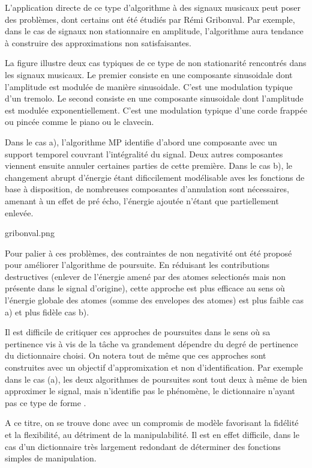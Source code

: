 L'application directe de ce type d'algorithme à des signaux musicaux peut poser des problèmes, dont certains ont été étudiés par Rémi Gribonval. Par exemple, dans le cas de signaux non stationnaire en amplitude, l'algorithme aura tendance à construire des approximations non satisfaisantes.

La figure illustre deux cas typiques de ce type de non stationarité rencontrés dans les signaux musicaux. Le premier consiste en une composante sinusoidale dont l'amplitude est modulée de manière sinusoidale. C'est une modulation typique d'un tremolo. Le second consiste en une composante sinusoidale dont l'amplitude est modulée exponentiellement. C'est une modulation typique d'une corde frappée ou pincée comme le piano ou le clavecin.

Dans le cas a), l'algorithme MP identifie d'abord une composante avec un support temporel couvrant l'intégralité du signal. Deux autres composantes viennent ensuite annuler certaines parties de cette première. Dans le cas b), le changement abrupt d'énergie étant dificcilement modélisable aves les fonctions de base à disposition, de nombreuses composantes d'annulation sont nécessaires, amenant à un effet de pré écho, l'énergie ajoutée n'étant que partiellement enlevée.

gribonval.png

Pour palier à ces problèmes, des contraintes de non negativité ont été proposé pour améliorer l'algorithme de poursuite\cite{gribonval1996sound}. En réduisant les contributions destructives (enlever de l'énergie amené par des atomes selectionés mais non présente dans le signal d'origine), cette approche est plus efficace au sens où l'énergie globale des atomes (somme des envelopes des atomes) est plus faible cas a)  et plus fidèle cas b).

Il est difficile de critiquer ces approches de poursuites dans le sens où sa pertinence vis à vis de la tâche va grandement dépendre du degré de pertinence du dictionnaire choisi. On notera tout de même que ces approches sont construites avec un objectif d'appromixation et non d'identification. Par exemple dans le cas (a), les deux algorithmes de poursuites sont tout deux à même de bien approximer le signal, mais \og n'identifie \fg pas le phénomène, le dictionnaire n'ayant pas ce type de forme .

A ce titre, on se trouve donc avec un compromis de modèle favorisant la fidélité et la flexibilité, au détriment de la manipulabilité. Il est en effet difficile, dans le cas d'un dictionnaire très largement redondant de déterminer des fonctions simples de manipulation.


